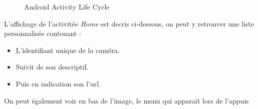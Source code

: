 \begin{center}
\begin{figure}[H]
  \label{activityLifeCycle}
  \centering
  \caption{Android Activity Life Cycle\protect\footnotemark}
  \end{figure}
  \end{center}
\newpage
 L'affichage de l'activitée \textit{Home} est decris ci-dessous, on peut y
 retrouver une liste personnalisée contenant :
 \begin{itemize}
   \item L'identifiant unique de la caméra.
   \item Suivit de son descriptif.
   \item Puis en indication son l'url.
 \end{itemize}
 On peut également voir en bas de l'image, le menu qui apparait lors de l'appuis
